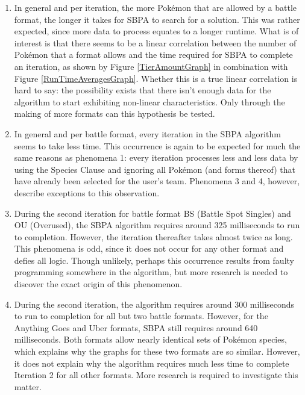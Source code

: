 \documentclass{article}
\begin{document}
\begin{enumerate}
	\item In general and per iteration, the more Pok\'emon that are allowed by a battle format, the longer it takes for SBPA to search for a solution. This was rather expected, since more data to process equates to a longer runtime. What is of interest is that there seems to be a linear correlation between the number of Pok\'emon that a format allows and the time required for SBPA to complete an iteration, as shown by Figure \ref{TierAmountGraph} in combination with Figure \ref{RunTimeAveragesGraph}. Whether this is a true linear correlation is hard to say: the possibility exists that there isn't enough data for the algorithm to start exhibiting non-linear characteristics. Only through the making of more formats can this hypothesis be tested.
	\item In general and per battle format, every iteration in the SBPA algorithm seems to take less time. This occurrence is again to be expected for much the same reasons as phenomena 1: every iteration processes less and less data by using the Species Clause and ignoring all Pok\'emon (and forms thereof) that have already been selected for the user's team. Phenomena 3 and 4, however, describe exceptions to this observation.
	\item During the second iteration for battle format BS (Battle Spot Singles) and OU (Overused), the SBPA algorithm requires around 325 milliseconds to run to completion. However, the iteration thereafter takes almost twice as long. This phenomena is odd, since it does not occur for any other format and defies all logic. Though unlikely, perhaps this occurrence results from faulty programming somewhere in the algorithm, but more research is needed to discover the exact origin of this phenomenon.
	\item During the second iteration, the algorithm requires around 300 milliseconds to run to completion for all but two battle formats. However, for the Anything Goes and Uber formats, SBPA still requires around 640 milliseconds. Both formats allow nearly identical sets of Pok\'emon species, which explains why the graphs for these two formats are so similar. However, it does not explain why the algorithm requires much less time to complete Iteration 2 for all other formats. More research is required to investigate this matter.
\end{enumerate}
\end{document}
